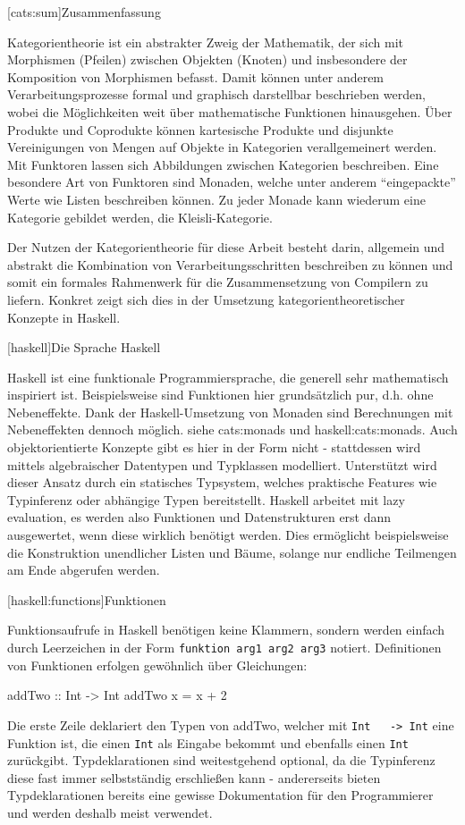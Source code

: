 \documentclass[11pt, a4paper, bibgerm]{scrbook}
\newcommand\icode[1]{\lstinline?#1?}
\newcommand\lchapter{}
\newcommand\lsection{}
\newcommand\sref{}
\begin{document}
\lsection[cats:sum]{Zusammenfassung}

Kategorientheorie ist ein abstrakter Zweig der Mathematik, der sich mit
Morphismen (Pfeilen) zwischen Objekten (Knoten) und insbesondere der
Komposition von Morphismen befasst. Damit können unter anderem
Verarbeitungsprozesse formal und graphisch darstellbar beschrieben
werden, wobei die Möglichkeiten weit über mathematische Funktionen
hinausgehen. Über Produkte und Coprodukte können kartesische Produkte
und disjunkte Vereinigungen von Mengen auf Objekte in Kategorien
verallgemeinert werden. Mit Funktoren lassen sich Abbildungen zwischen
Kategorien beschreiben. Eine besondere Art von Funktoren sind Monaden,
welche unter anderem ``eingepackte'' Werte wie Listen beschreiben
können. Zu jeder Monade kann wiederum eine Kategorie gebildet werden,
die Kleisli-Kategorie.

Der Nutzen der Kategorientheorie für diese Arbeit besteht darin,
allgemein und abstrakt die Kombination von Verarbeitungsschritten
beschreiben zu können und somit ein formales Rahmenwerk für die
Zusammensetzung von Compilern zu liefern. Konkret zeigt sich dies in der
Umsetzung kategorientheoretischer Konzepte in Haskell.

\lchapter[haskell]{Die Sprache Haskell}

Haskell ist eine funktionale Programmiersprache, die generell sehr
mathematisch inspiriert ist. Beispielsweise sind Funktionen hier
grundsätzlich pur, d.h. ohne Nebeneffekte. Dank der Haskell-Umsetzung
von Monaden sind Berechnungen mit Nebeneffekten dennoch möglich. siehe
\sref{cats:monads} und \sref{haskell:cats:monads}. Auch
objektorientierte Konzepte gibt es hier in der Form nicht - stattdessen
wird mittels algebraischer Datentypen und Typklassen
modelliert. Unterstützt wird dieser Ansatz durch ein statisches
Typsystem, welches praktische Features wie Typinferenz oder abhängige
Typen bereitstellt. Haskell arbeitet mit lazy evaluation, es werden also
Funktionen und Datenstrukturen erst dann ausgewertet, wenn diese
wirklich benötigt werden. Dies ermöglicht beispielsweise die
Konstruktion unendlicher Listen und Bäume, solange nur endliche
Teilmengen am Ende abgerufen werden.

\lsection[haskell:functions]{Funktionen}

Funktionsaufrufe in Haskell benötigen keine Klammern, sondern werden
einfach durch Leerzeichen in der Form \icode{funktion arg1 arg2 arg3}
notiert. Definitionen von Funktionen erfolgen gewöhnlich über
Gleichungen:
\begin{code}
addTwo :: Int -> Int
addTwo x = x + 2  
\end{code}
Die erste Zeile deklariert den Typen von addTwo, welcher mit \icode{Int
  -> Int} eine Funktion ist, die einen \icode{Int} als Eingabe bekommt
und ebenfalls einen \icode{Int} zurückgibt. Typdeklarationen sind
weitestgehend optional, da die Typinferenz diese fast immer
selbstständig erschließen kann - andererseits bieten Typdeklarationen
bereits eine gewisse Dokumentation für den Programmierer und werden
deshalb meist verwendet.
\end{document}

